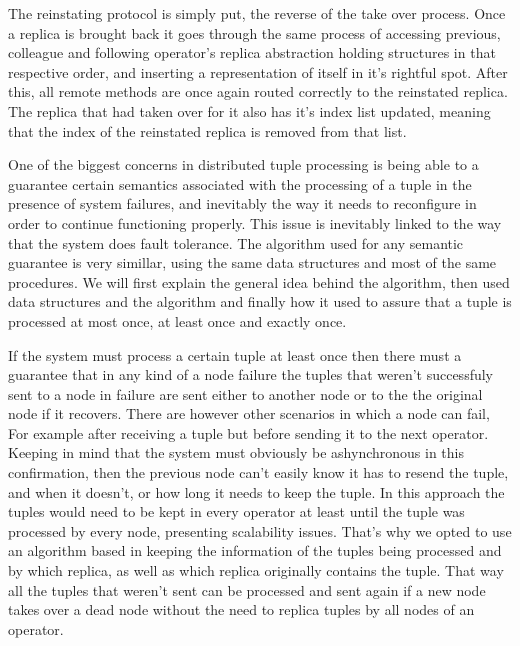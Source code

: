 \documentclass[times, 10pt,twocolumn]{article}
\begin{document}
The reinstating protocol is simply put, the reverse of the take over
process. Once a replica is brought back it goes through the same process
of accessing previous, colleague and following operator's replica
abstraction holding structures in that respective order, and inserting a
representation of itself in it's rightful spot.  After this, all remote
methods are once again routed correctly to the reinstated replica.  The
replica that had taken over for it also has it's index list updated,
meaning that the index of the reinstated replica is removed from that
list.

One of the biggest concerns in distributed tuple processing is being able
to a guarantee certain semantics associated with the processing of a tuple
in the presence of system failures, and inevitably the way it needs to
reconfigure in order to continue functioning properly. This issue is
inevitably linked to the way that the system does fault tolerance. The
algorithm used for any semantic guarantee is very simillar, using the same
data structures and most of the same procedures. We will first explain the
general idea behind the algorithm, then used data structures and the
algorithm and finally how it used to assure that a tuple is processed at
most once, at least once and exactly once.



If the system must process a certain tuple at least once then there must a
guarantee that in any kind of a node failure the tuples that weren't
successfuly sent to a node in failure are sent either to another node or
to the the original node if it recovers. There are however other scenarios
in which a node can fail, For example after receiving a tuple but before
sending it to the next operator. Keeping in mind that the system must
obviously be ashynchronous in this confirmation, then the previous node
can't easily know it has to resend the tuple, and when it doesn't, or how
long it needs to keep the tuple.  In this approach the tuples would need
to be kept in every operator at least until the tuple was processed by
every node, presenting scalability issues. That's why we opted to use an
algorithm based in keeping the information of the tuples being processed
and by which replica, as well as which replica originally contains the
tuple.  That way all the tuples that weren't sent can be processed and
sent again if a new node takes over a dead node without the need to
replica tuples by all nodes of an operator.
\end{document}
